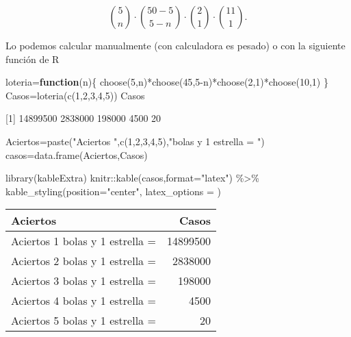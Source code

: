 \documentclass[
]{article}
\newenvironment{Shaded}{\begin{snugshade}}{\end{snugshade}}
\newcommand{\AttributeTok}[1]{\textcolor[rgb]{0.77,0.63,0.00}{#1}}
\newcommand{\ControlFlowTok}[1]{\textcolor[rgb]{0.13,0.29,0.53}{\textbf{#1}}}
\newcommand{\DecValTok}[1]{\textcolor[rgb]{0.00,0.00,0.81}{#1}}
\newcommand{\FunctionTok}[1]{\textcolor[rgb]{0.00,0.00,0.00}{#1}}
\newcommand{\NormalTok}[1]{#1}
\newcommand{\OtherTok}[1]{\textcolor[rgb]{0.56,0.35,0.01}{#1}}
\newcommand{\SpecialCharTok}[1]{\textcolor[rgb]{0.00,0.00,0.00}{#1}}
\newcommand{\StringTok}[1]{\textcolor[rgb]{0.31,0.60,0.02}{#1}}
\begin{document}
\[
\binom{5}{n}\cdot \binom{50-5}{5-n}\cdot \binom{2}{1}\cdot \binom{11}{1}.
\]

Lo podemos calcular manualmente (con calculadora es pesado) o con la
siguiente función de R

\begin{Shaded}
\begin{Highlighting}[]
\NormalTok{loteria}\OtherTok{=}\ControlFlowTok{function}\NormalTok{(n)\{}
\FunctionTok{choose}\NormalTok{(}\DecValTok{5}\NormalTok{,n)}\SpecialCharTok{*}\FunctionTok{choose}\NormalTok{(}\DecValTok{45}\NormalTok{,}\DecValTok{5}\SpecialCharTok{{-}}\NormalTok{n)}\SpecialCharTok{*}\FunctionTok{choose}\NormalTok{(}\DecValTok{2}\NormalTok{,}\DecValTok{1}\NormalTok{)}\SpecialCharTok{*}\FunctionTok{choose}\NormalTok{(}\DecValTok{10}\NormalTok{,}\DecValTok{1}\NormalTok{)}
\NormalTok{\}}
\NormalTok{Casos}\OtherTok{=}\FunctionTok{loteria}\NormalTok{(}\FunctionTok{c}\NormalTok{(}\DecValTok{1}\NormalTok{,}\DecValTok{2}\NormalTok{,}\DecValTok{3}\NormalTok{,}\DecValTok{4}\NormalTok{,}\DecValTok{5}\NormalTok{))}
\NormalTok{Casos}
\end{Highlighting}
\end{Shaded}

{[}1{]} 14899500 2838000 198000 4500 20

\begin{Shaded}
\begin{Highlighting}[]
\NormalTok{Aciertos}\OtherTok{=}\FunctionTok{paste}\NormalTok{(}\StringTok{"Aciertos "}\NormalTok{,}\FunctionTok{c}\NormalTok{(}\DecValTok{1}\NormalTok{,}\DecValTok{2}\NormalTok{,}\DecValTok{3}\NormalTok{,}\DecValTok{4}\NormalTok{,}\DecValTok{5}\NormalTok{),}\StringTok{"bolas y  1 estrella = "}\NormalTok{)}
\NormalTok{casos}\OtherTok{=}\FunctionTok{data.frame}\NormalTok{(Aciertos,Casos)}

\FunctionTok{library}\NormalTok{(kableExtra)}
\NormalTok{knitr}\SpecialCharTok{::}\FunctionTok{kable}\NormalTok{(casos,}\AttributeTok{format=}\StringTok{"latex"}\NormalTok{) }\SpecialCharTok{\%\textgreater{}\%} \FunctionTok{kable\_styling}\NormalTok{(}\AttributeTok{position=}\StringTok{"center"}\NormalTok{, }\AttributeTok{latex\_options =}\NormalTok{ ) }
\end{Highlighting}
\end{Shaded}

\begin{table}
\centering
\begin{tabular}{l|r}
\hline
Aciertos & Casos\\
\hline
Aciertos  1 bolas y  1 estrella = & 14899500\\
\hline
Aciertos  2 bolas y  1 estrella = & 2838000\\
\hline
Aciertos  3 bolas y  1 estrella = & 198000\\
\hline
Aciertos  4 bolas y  1 estrella = & 4500\\
\hline
Aciertos  5 bolas y  1 estrella = & 20\\
\hline
\end{tabular}
\end{table}
\end{document}
